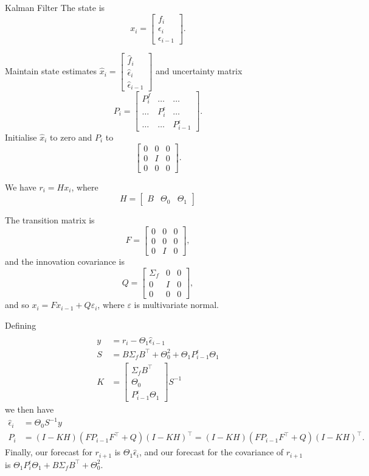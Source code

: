 \documentclass{beamer}
\begin{document}
\begin{frame}{Kalman Filter}
	The state is
	$$x_i = \left[\begin{matrix}f_i \\ \epsilon_i \\ \epsilon_{i-1}\end{matrix}\right].$$

	Maintain state estimates $\hat{x}_i = \left[\begin{matrix}\hat{f}_i \\ \hat{\epsilon}_i \\ \hat{\epsilon}_{i-1}\end{matrix}\right]$ and uncertainty matrix
	$$P_i = \left[\begin{matrix}P^f_i&\ldots&\ldots\\\ldots&P^\epsilon_i&\ldots\\\ldots&\ldots&P^\epsilon_{i-1}\end{matrix}\right].$$
	Initialise $\hat{x}_i$ to zero and $P_i$ to 
	$$\left[\begin{matrix}0 & 0 & 0 \\ 0 & I & 0 \\ 0 & 0 & 0\end{matrix}\right].$$

	We have $r_i = Hx_i$, where
	$$H = \left[\begin{matrix}B & \Theta_0 & \Theta_1\end{matrix}\right]$$

	The transition matrix is
	$$F = \left[\begin{matrix}0 & 0 & 0 \\ 0 & 0 & 0 \\ 0 & I & 0\end{matrix}\right],$$
	and the innovation covariance is
	$$Q = \left[\begin{matrix}\Sigma_f & 0 & 0 \\ 0 & I & 0 \\ 0 & 0 & 0\end{matrix}\right],$$
	and so $x_i = Fx_{i-1} + Q\varepsilon_i$, where $\varepsilon$ is multivariate normal.

	Defining
	\begin{align*}
	\\	y				&= r_i - \Theta_1 \hat{\epsilon}_{i-1}
	\\	S				&= B\Sigma_f B^\top + \Theta_0^2 + \Theta_1 P^\epsilon_{i-1}\Theta_1
	\\	K				&= \left[\begin{matrix}\Sigma_f B^\top \\ \Theta_0 \\ P^\epsilon_{i-1} \Theta_1 \end{matrix}\right] S^{-1} 
	\end{align*}
	we then have
	\begin{align*}
		\hat{\epsilon}_i&= \Theta_0 S^{-1} y
	\\	P_i		&= (I-KH) (F P_{i-1} F^\top + Q) (I-KH)^\top = (I-KH) (F P_{i-1} F^\top + Q) (I-KH)^\top.
	\end{align*}
	Finally, our forecast for $r_{i+1}$ is $\Theta_1\hat{\epsilon}_i$, and our forecast for the covariance of $r_{i+1}$ is $\Theta_1 P^\epsilon_i \Theta_1 + B\Sigma_f B^\top+\Theta_0^2$.


\end{frame}
\end{document}
